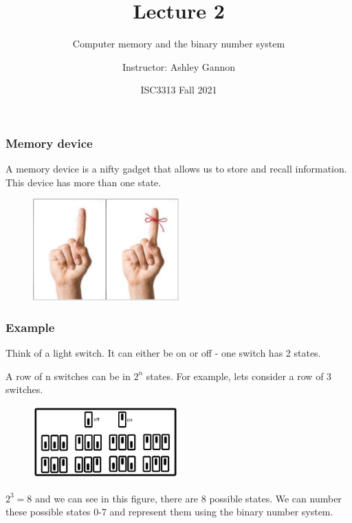 \documentclass{if-beamer}
\title[Lecture 2]{Lecture 2}
\subtitle{Computer memory and the binary number system}
\author{Instructor: Ashley Gannon}
\date{ISC3313 Fall 2021}
\begin{document}
\begin{frame}
  \titlepage
\end{frame}

\begin{frame}
\frametitle{Memory device}
A memory device is a nifty gadget that allows us to store and recall information. This device has more than one state.\\

\begin{figure}
	\center
	\includegraphics[width = 0.5\textwidth]{figures/finger.jpg}
\end{figure}
\end{frame}

\begin{frame}
\frametitle{Example}
Think of a light switch. It can either be on or off - one switch has 2 states. 

A row of n switches can be in $2^n$ states. For example, lets consider a row of 3 switches. 

\begin{figure}
	\center
	\includegraphics[width = 0.5\textwidth]{figures/lights.jpg}
\end{figure}

$2^3 = 8$ and we can see in this figure, there are $8$ possible states. We can number these possible states 0-7 and represent them using the binary number system.  

\end{frame}
\end{document}
